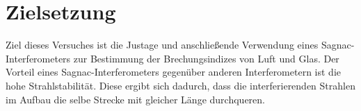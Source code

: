 \section{Zielsetzung}
\label{sec:Zielsetzung}

Ziel dieses Versuches ist die Justage und anschließende Verwendung eines Sagnac-Interferometers zur Bestimmung der Brechungsindizes von Luft und Glas.
Der Vorteil eines Sagnac-Interferometers gegenüber anderen Interferometern ist die hohe Strahlstabilität. Diese ergibt sich dadurch, dass die interferierenden Strahlen
im Aufbau die selbe Strecke mit gleicher Länge durchqueren.